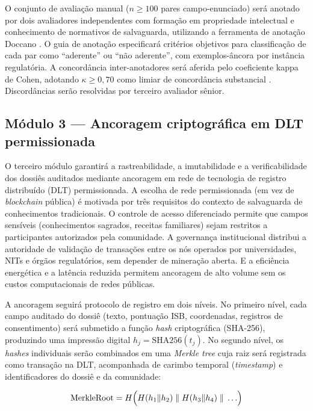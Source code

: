 O conjunto de avaliação manual ($n \geq 100$ pares campo-enunciado) será anotado por dois avaliadores independentes com formação em propriedade intelectual e conhecimento de normativos de salvaguarda, utilizando a ferramenta de anotação Doccano \cite{Nakayama2018}. O guia de anotação especificará critérios objetivos para classificação de cada par como ``aderente'' ou ``não aderente'', com exemplos-âncora por instância regulatória. A concordância inter-anotadores será aferida pelo coeficiente kappa de Cohen, adotando $\kappa \geq 0{,}70$ como limiar de concordância substancial \cite{Landis1977}. Discordâncias serão resolvidas por terceiro avaliador sênior.

\subsection{Módulo 3 --- Ancoragem criptográfica em DLT permissionada}
\label{subsec:dlt_cap5}

O terceiro módulo garantirá a rastreabilidade, a imutabilidade e a verificabilidade dos dossiês auditados mediante ancoragem em rede de tecnologia de registro distribuído (DLT) permissionada. A escolha de rede permissionada (em vez de \textit{blockchain} pública) é motivada por três requisitos do contexto de salvaguarda de conhecimentos tradicionais. O controle de acesso diferenciado permite que campos sensíveis (conhecimentos sagrados, receitas familiares) sejam restritos a participantes autorizados pela comunidade. A governança institucional distribui a autoridade de validação de transações entre os nós operados por universidades, NITs e órgãos regulatórios, sem depender de mineração aberta. E a eficiência energética e a latência reduzida permitem ancoragem de alto volume sem os custos computacionais de redes públicas.

A ancoragem seguirá protocolo de registro em dois níveis. No primeiro nível, cada campo auditado do dossiê (texto, pontuação ISB, coordenadas, registros de consentimento) será submetido a função \textit{hash} criptográfica (SHA-256), produzindo uma impressão digital $h_j = \text{SHA256}(t_j)$. No segundo nível, os \textit{hashes} individuais serão combinados em uma \textit{Merkle tree} cuja raiz será registrada como transação na DLT, acompanhada de carimbo temporal (\textit{timestamp}) e identificadores do dossiê e da comunidade:

\begin{equation}
\text{MerkleRoot} = H\Bigl(H(h_1 \| h_2) \;\|\; H(h_3 \| h_4) \;\|\; \ldots\Bigr)
\label{eq:merkle_cap5}
\end{equation}

